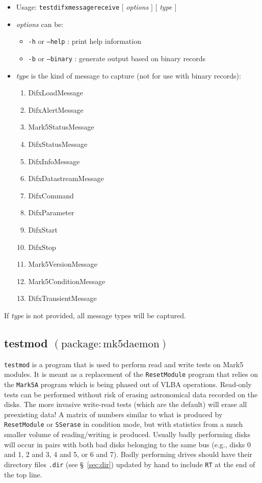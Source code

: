 \begin{itemize}
\item[] Usage: {\tt testdifxmessagereceive}  $[$ {\em options} $]$  $[$ {\em type} $]$
\item[] {\em options} can be:
\begin{itemize}
\item[] {\tt -h} or {\tt --help} : print help information
\item[] {\tt -b} or {\tt --binary} : generate output based on binary records
\end{itemize}
\item[] {\em type} is the kind of message to capture (not for use with binary records):
\begin{enumerate}
\item DifxLoadMessage
\item DifxAlertMessage
\item Mark5StatusMessage
\item DifxStatusMessage
\item DifxInfoMessage
\item DifxDatastreamMessage
\item DifxCommand
\item DifxParameter
\item DifxStart
\item DifxStop
\item Mark5VersionMessage
\item Mark5ConditionMessage
\item DifxTransientMessage
\end{enumerate}
\end{itemize}

If {\em type} is not provided, all message types will be captured.






\subsection{testmod {\small $\mathrm{(package: mk5daemon)}$}} \label{sec:testmod}

{\tt testmod} is a program that is used to perform read and write tests on Mark5 modules.  
It is meant as a replacement of the {\tt ResetModule} program that relies on the {\tt Mark5A} program which is being phased out of VLBA operations.
Read-only tests can be performed without risk of erasing astronomical data recorded on the disks.
The more invasive write-read tests (which are the default) will erase all preexisting data!
A matrix of numbers similar to what is produced by {\tt ResetModule} or {\tt SSerase} in condition mode, but with statistics from a much smaller volume of reading/writing is produced.
Usually badly performing disks will occur in pairs with both bad disks belonging to the same bus (e.g., disks 0 and 1, 2 and 3, 4 and 5, or 6 and 7).  
Badly performing drives should have their directory files {\tt .dir} (see \S~\ref{sec:dir}) updated by hand to include {\tt RT} at the end of the top line.

